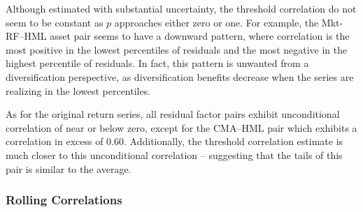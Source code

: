 Although estimated with substantial uncertainty, the threshold correlation do not seem to be constant as $p$ approaches either zero or one. For example, the Mkt-RF--HML asset pair seems to have a downward pattern, where correlation is the most positive in the lowest percentiles of residuals and the most negative in the highest percentile of residuals. In fact, this pattern is unwanted from a diversification perspective, as diversification benefits decrease when the series are realizing in the lowest percentiles.

As for the original return series, all residual factor pairs exhibit unconditional correlation of near or below zero, except for the CMA--HML pair which exhibits a correlation in excess of $0.60$. Additionally, the threshold correlation estimate is much closer to this unconditional correlation -- suggesting that the tails of this pair is similar to the average.

\subsubsection{Rolling Correlations}

